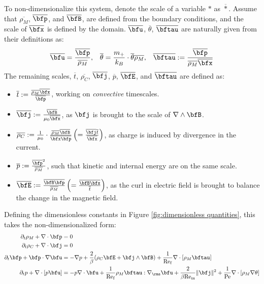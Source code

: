     To non-dimensionalize this system, denote the scale of a variable $*$ as $\overline{*}$. Assume that $\overline{\rho_{M}}$, $\overline{\bfp}$, and $\overline{\bfB}$, are defined from the boundary conditions, and the scale of $\overline{\bfx}$ is defined by the domain. $\overline{\bfu}$, $\overline{\theta}$, $\overline{\bftau}$ are naturally given from their definitions as:
    \begin{align}
        \overline{\bfu}  =  \frac{\overline{\bfp}}{\overline{\rho_{M}}},  &&
        \overline{\theta}  =  \frac{m_{+}}{k_{B}}\cdot{\overline{\theta}\overline{\rho_{M}}},  &&
        \overline{\bftau}  :=  \frac{\overline{\bfp}}{\overline{\rho_{M}}\overline{\bfx}}
    \end{align}
    The remaining scales, $\overline{t}$, $\overline{\rho_{C}}$, $\overline{\bfj}$, $\overline{p}$, $\overline{\bfE}$, and $\overline{\bftau}$ are defined as:  
    \begin{itemize}
        \item  $\overline{t}  :=  \frac{\overline{\rho_{M}}\overline{\bfx}}{\overline{\bfp}}$, working on \emph{convective} timescales.
        \item  $\overline{\bfj}  :=  \frac{\overline{\bfB}}{\mu_{0}\overline{\bfx}}$, as $\bfj$ is brought to the scale of $\nabla\wedge\bfB$.
        \item  $\overline{\rho_{C}}  :=  \frac{1}{\mu_{0}}\cdot\frac{\overline{\rho_{M}}\overline{\bfB}}{\overline{\bfx}\overline{\bfp}}  \left(=  \frac{\overline{\bfj}\overline{t}}{\overline{\bfx}}\right)$, as charge is induced by divergence in the current.
        \item  $\overline{p}  :=  \frac{\overline{\bfp}^{2}}{\overline{\rho_{M}}}$, such that kinetic and internal energy are on the same scale.
        \item  $\overline{\bfE}  :=  \frac{\overline{\bfB}\overline{\bfp}}{\overline{\rho_{M}}}  \left(=  \frac{\overline{\bfB}\overline{\bfx}}{\overline{t}}\right)$, as the curl in electric field is brought to balance the change in the magnetic field.
    \end{itemize}
    Defining the dimensionless constants in Figure \ref{fig:dimensionless quantities}, this takes the non-dimensionalized form:
    \begin{align}
        \partial_{t}\rho_{M} + \nabla\cdot\bfp  &=  0  \\
        \partial_{t}\rho_{C} + \nabla\cdot\bfj  &=  0  \\
        \partial_{t}\bfp + \bfp\cdot\nabla\bfu  &=  - \nabla p + \frac{2}{\beta}(\rho_{C}\bfE + \bfj\wedge\bfB) + \frac{1}{\rmRef}\nabla\cdot[\rho_{M}\bftau]  \\
        \partial_{t}p + \nabla\cdot[p\bfu]  &=  - p\nabla\cdot\bfu + \frac{1}{\rmRef}\rho_{M}\bftau:\nabla_{\rms}\bfu + \frac{2}{\beta\rmRem}\|\bfj\|^{2} + \frac{1}{\rmPe}\nabla\cdot[\rho_{M}\nabla\theta]
    \end{align}
